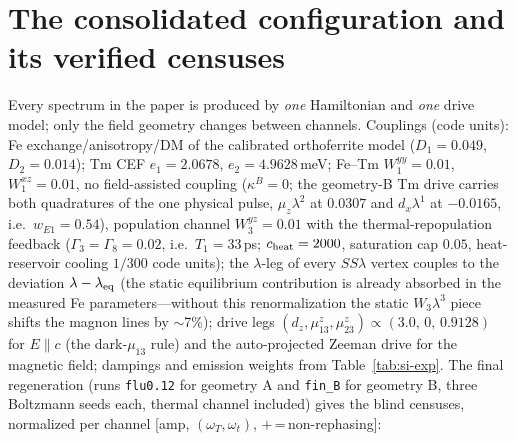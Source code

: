 \documentclass[11pt]{article}
\begin{document}
\section{The consolidated configuration and its verified censuses}
\label{si:consolidated}

Every spectrum in the paper is produced by \emph{one} Hamiltonian and
\emph{one} drive model; only the field geometry changes between
channels.  Couplings (code units): Fe exchange/anisotropy/DM of the
calibrated orthoferrite model ($D_1=0.049$, $D_2=0.014$); Tm CEF
$e_1=2.0678$, $e_2=4.9628$\,meV; Fe--Tm $W^{yy}_1=0.01$,
$W^{xz}_1=0.01$, no field-assisted coupling ($\kappa^B=0$; the
geometry-B Tm drive carries both quadratures of the one physical
pulse, $\mu_z\lambda^2$ at $0.0307$ and $d_x\lambda^1$ at $-0.0165$,
i.e.\ $w_{E1}=0.54$), population channel
$W_3^{yz}=0.01$ with the thermal-repopulation feedback
($\Gamma_3=\Gamma_8=0.02$, i.e.\ $T_1=33$\,ps;
$c_{\rm heat}=2000$, saturation cap $0.05$, heat-reservoir cooling
$1/300$ code units); the $\lambda$-leg of every $S S\lambda$ vertex
couples to the deviation $\lambda-\lambda_{\rm eq}$ (the static
equilibrium contribution is already absorbed in the measured Fe
parameters---without this renormalization the static $W_3\lambda^3$
piece shifts the magnon lines by $\sim$7\%); drive legs
$(d_z,\mu^z_{13},\mu^z_{23})\propto(3.0,\,0,\,0.9128)$ for
$E\!\parallel\!c$ (the dark-$\mu_{13}$ rule) and the auto-projected
Zeeman drive for the magnetic field; dampings and emission weights from
Table~\ref{tab:si-exp}.  The final regeneration (runs \texttt{flu0.12} for geometry A and
\texttt{fin\_B} for geometry B, three Boltzmann seeds each, thermal
channel included) gives the
blind censuses, normalized per channel [amp, $(\omega_T,\omega_t)$,
$+$\,=\,non-rephasing]:
\end{document}
